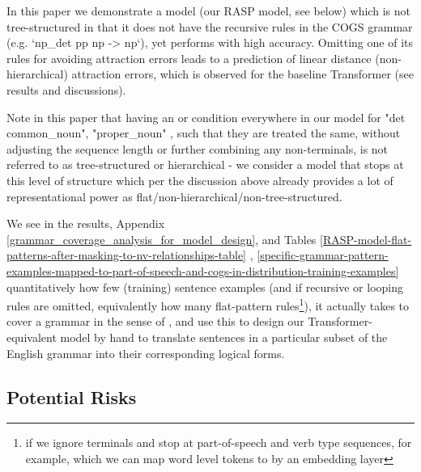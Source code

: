 \documentclass[11pt]{article}
\begin{document}
{\begin{footnotesize}
In this paper we demonstrate a model (our RASP model, see below) which is not tree-structured in that it does not have the recursive rules in the COGS grammar (e.g. `np\_det pp np -> np`), yet performs with high accuracy. Omitting one of its rules for avoiding attraction errors leads to a prediction of linear distance (non-hierarchical) attraction errors, which is observed for the baseline \citep{Wu2023} Transformer (see results and discussions).
\end{footnotesize}
}

Note in this paper that having an or condition everywhere in our model for "det common\_noun", "proper\_noun" , such that they are treated the same, without adjusting the sequence length or further combining any non-terminals, is not referred to as tree-structured or hierarchical - we consider a model that stops at this level of structure which per the discussion above already provides a lot of representational power as flat/non-hierarchical/non-tree-structured.

We see in the results, Appendix \ref{grammar_coverage_analysis_for_model_design}, and Tables \ref{RASP-model-flat-patterns-after-masking-to-nv-relationships-table} , \ref{specific-grammar-pattern-examples-mapped-to-part-of-speech-and-cogs-in-distribution-training-examples}  quantitatively how few (training) sentence examples (and if recursive or looping rules are omitted, equivalently how many flat-pattern rules\footnote{if we ignore terminals and stop at part-of-speech and verb type sequences, for example, which we can map word level tokens to by an embedding layer}), it actually takes to cover a grammar in the sense of \citep{fuzzingbook2023:GrammarCoverageFuzzer}, and use this to design our Transformer-equivalent model by hand to translate sentences in a particular subset of the English grammar into their corresponding logical forms.

\subsection{Potential Risks}
\label{potential_risks}
\end{document}
